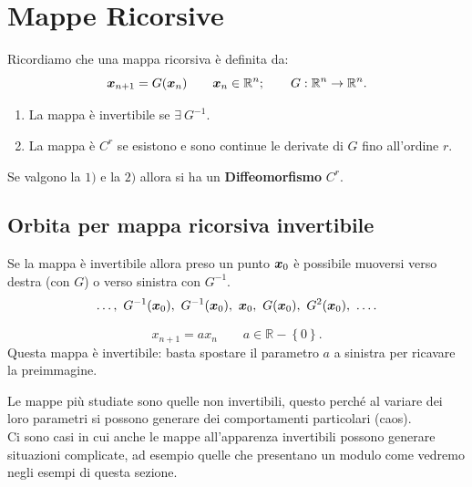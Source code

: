 \section{Mappe Ricorsive}%
\label{sub:Mappe Ricorsive}
Ricordiamo che una mappa ricorsiva è definita da:
\[
    \boldsymbol{x}_{n+1} = G(\boldsymbol{x}_n) \qquad \boldsymbol{x}_n \in \mathbb{R}^n; \qquad G:\mathbb{R}^n\to \mathbb{R}^n
.\] 
\begin{enumerate}
    \item La mappa è invertibile se $\exists \ G^{-1}$.
    \item La mappa è $C^r$ se esistono e sono continue le derivate di $G$ fino all'ordine $r$.
\end{enumerate}
Se valgono la $1)$ e la $2)$ allora si ha un \textbf{Diffeomorfismo} $C^r$.
\subsection{Orbita per mappa ricorsiva invertibile}%
\label{sub:Orbita per mappa ricorsiva invertibile}
Se la mappa è invertibile allora preso un punto $\boldsymbol{x}_0$ è possibile muoversi verso destra (con $G$) o verso sinistra con $G^{-1}$.
\[
    \ldots, \ G^{-1}(\vect{x}_0), \ G^{-1}(\vect{x}_0), \ \vect{x}_0, \ G(\vect{x}_0), \ G^2(\vect{x}_0), \ \ldots
.\] 
\begin{exmp}
    \[
        x_{n+1} = a x_n \qquad a \in \mathbb{R} - \left\{0\right\}
    .\] 
    Questa mappa è invertibile: basta spostare il parametro $a$ a sinistra per ricavare la preimmagine.
\end{exmp}
\noindent
Le mappe più studiate sono quelle non invertibili, questo perché al variare dei loro parametri si possono generare dei comportamenti particolari (caos).\\
Ci sono casi in cui anche le mappe all'apparenza invertibili possono generare situazioni complicate, ad esempio quelle che presentano un modulo come vedremo negli esempi di questa sezione.
